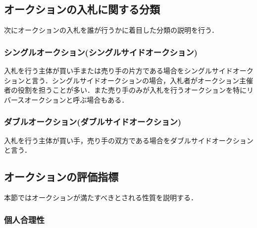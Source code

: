 \hypertarget{ux30aaux30fcux30afux30b7ux30e7ux30f3ux306eux5165ux672dux306bux95a2ux3059ux308bux5206ux985e}{%
\subsection{オークションの入札に関する分類}\label{ux30aaux30fcux30afux30b7ux30e7ux30f3ux306eux5165ux672dux306bux95a2ux3059ux308bux5206ux985e}}

次にオークションの入札を誰が行うかに着目した分類の説明を行う．

\hypertarget{ux30b7ux30f3ux30b0ux30ebux30aaux30fcux30afux30b7ux30e7ux30f3ux30b7ux30f3ux30b0ux30ebux30b5ux30a4ux30c9ux30aaux30fcux30afux30b7ux30e7ux30f3}{%
\subsubsection{シングルオークション(シングルサイドオークション)}\label{ux30b7ux30f3ux30b0ux30ebux30aaux30fcux30afux30b7ux30e7ux30f3ux30b7ux30f3ux30b0ux30ebux30b5ux30a4ux30c9ux30aaux30fcux30afux30b7ux30e7ux30f3}}

入札を行う主体が買い手または売り手の片方である場合をシングルサイドオークションと言う．シングルサイドオークションの場合，入札者がオークション主催者の役割を担うことが多い．また売り手のみが入札を行うオークションを特にリバースオークションと呼ぶ場合もある．

\hypertarget{ux30c0ux30d6ux30ebux30aaux30fcux30afux30b7ux30e7ux30f3ux30c0ux30d6ux30ebux30b5ux30a4ux30c9ux30aaux30fcux30afux30b7ux30e7ux30f3}{%
\subsubsection{ダブルオークション(ダブルサイドオークション)}\label{ux30c0ux30d6ux30ebux30aaux30fcux30afux30b7ux30e7ux30f3ux30c0ux30d6ux30ebux30b5ux30a4ux30c9ux30aaux30fcux30afux30b7ux30e7ux30f3}}

入札を行う主体が買い手，売り手の双方である場合をダブルサイドオークションと言う．

\hypertarget{ux30aaux30fcux30afux30b7ux30e7ux30f3ux306eux8a55ux4fa1ux6307ux6a19}{%
\subsection{オークションの評価指標}\label{ux30aaux30fcux30afux30b7ux30e7ux30f3ux306eux8a55ux4fa1ux6307ux6a19}}

本節ではオークションが満たすべきとされる性質を説明する．

\hypertarget{ux500bux4ebaux5408ux7406ux6027}{%
\subsubsection{個人合理性}\label{ux500bux4ebaux5408ux7406ux6027}}

